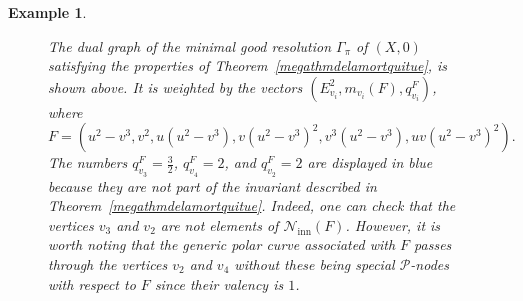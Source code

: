 \documentclass[reqno,dvipsnames,12pt]{amsart}
\newtheorem{exam}[thm]{Example}
\newcommand{\blue}[1]{{\color{blue} #1}}
\begin{document}
\begin{exam}
\begin{itemize}
\begin{figure}[H]
  \caption{The dual graph of the minimal good resolution $\Gamma_\pi$ of $(X,0)$ satisfying the properties of Theorem~\ref{megathmdelamortquitue}, is shown above. 
It is weighted by the vectors $(E_{v_i}^2, m_{v_i}(F), q_{v_i}^{F})$, where $F=(u^2-v^3,v^2,u(u^2-v^3),v(u^2-v^3)^2,v^3(u^2-v^3),uv(u^2-v^3)^2).$ The numbers $q_{v_3}^{F}=\frac{3}{2}$, $q_{v_4}^{F}=2$, and $q_{v_2}^{F}=2$ are displayed in blue because they are not part of the invariant described in Theorem~\ref{megathmdelamortquitue}.
Indeed, one can check that the vertices $v_3$ and $v_2$ are not elements of $\mathcal{N}_{\mathrm{inn}}(F)$. However, it is worth noting that the generic polar curve associated with $F$ passes through the vertices $v_2$ and $v_4$ without these being special $\mathcal{P}$-nodes with respect to $F$ since their valency is $1$. }



\end{figure}
\end{itemize}
\end{exam}
\end{document}
